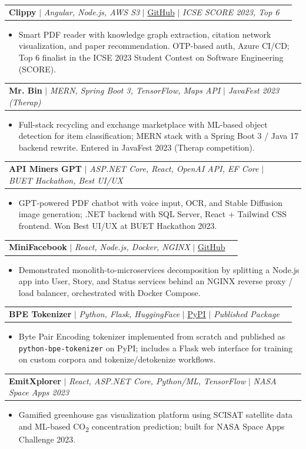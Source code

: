 \documentclass[letterpaper,11pt]{article}
\makeatletter
\newcommand{\resumeItem}[1]{
  \item\small{{#1 \vspace{-2pt}}}
}
\newcommand{\resumeProjectHeading}[2]{
    \vspace{-2pt}\item
    \begin{tabular*}{0.97\textwidth}{l@{\extracolsep{\fill}}r}
      \small#1 & #2 \\
    \end{tabular*}\vspace{-7pt}
}
\newcommand{\resumeItemListStart}{\begin{itemize}}
\newcommand{\resumeItemListEnd}{\end{itemize}\vspace{-5pt}}
\makeatother
\begin{document}
      \resumeProjectHeading
        {\textbf{Clippy} $|$ \emph{Angular, Node.js, AWS S3} $|$ \href{https://github.com/jaf107/Clippy}{\color{blue}GitHub} $|$ \textit{ICSE SCORE 2023, Top 6}}{}
          \resumeItemListStart
            \resumeItem{Smart PDF reader with knowledge graph extraction, citation network visualization, and paper recommendation. OTP-based auth, Azure CI/CD; Top 6 finalist in the ICSE 2023 Student Contest on Software Engineering (SCORE).}
          \resumeItemListEnd

      \resumeProjectHeading
        {\textbf{Mr. Bin} $|$ \emph{MERN, Spring Boot 3, TensorFlow, Maps API} $|$ \textit{JavaFest 2023 (Therap)}}{}
          \resumeItemListStart
            \resumeItem{Full-stack recycling and exchange marketplace with ML-based object detection for item classification; MERN stack with a Spring Boot 3 / Java 17 backend rewrite. Entered in JavaFest 2023 (Therap competition).}
          \resumeItemListEnd

      \resumeProjectHeading
        {\textbf{API Miners GPT} $|$ \emph{ASP.NET Core, React, OpenAI API, EF Core} $|$ \textit{BUET Hackathon, Best UI/UX}}{}
          \resumeItemListStart
            \resumeItem{GPT-powered PDF chatbot with voice input, OCR, and Stable Diffusion image generation; .NET backend with SQL Server, React + Tailwind CSS frontend. Won Best UI/UX at BUET Hackathon 2023.}
          \resumeItemListEnd

      \resumeProjectHeading
        {\textbf{MiniFacebook} $|$ \emph{React, Node.js, Docker, NGINX} $|$ \href{https://github.com/jaf107/Distributed-Systems-Lab}{\color{blue}GitHub}}{}
          \resumeItemListStart
            \resumeItem{Demonstrated monolith-to-microservices decomposition by splitting a Node.js app into User, Story, and Status services behind an NGINX reverse proxy / load balancer, orchestrated with Docker Compose.}
          \resumeItemListEnd

      \resumeProjectHeading
        {\textbf{BPE Tokenizer} $|$ \emph{Python, Flask, HuggingFace} $|$ \href{https://pypi.org/project/python-bpe-tokenizer/}{\color{blue}PyPI} $|$ \textit{Published Package}}{}
          \resumeItemListStart
            \resumeItem{Byte Pair Encoding tokenizer implemented from scratch and published as \texttt{python-bpe-tokenizer} on PyPI; includes a Flask web interface for training on custom corpora and tokenize/detokenize workflows.}
          \resumeItemListEnd

      \resumeProjectHeading
        {\textbf{EmitXplorer} $|$ \emph{React, ASP.NET Core, Python/ML, TensorFlow} $|$ \textit{NASA Space Apps 2023}}{}
          \resumeItemListStart
            \resumeItem{Gamified greenhouse gas visualization platform using SCISAT satellite data and ML-based CO\textsubscript{2} concentration prediction; built for NASA Space Apps Challenge 2023.}
          \resumeItemListEnd
\end{document}
